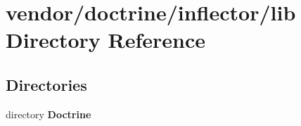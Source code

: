 \section{vendor/doctrine/inflector/lib Directory Reference}
\label{dir_066e1738fb8a99fde4aa7ae08f08ba3b}
\subsection*{Directories}
\begin{DoxyCompactItemize}
\item 
directory {\bf Doctrine}
\end{DoxyCompactItemize}
